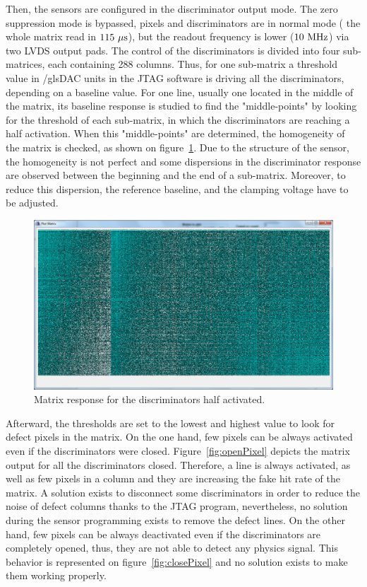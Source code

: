   Then, the sensors are configured in the discriminator output mode.
  The zero suppression mode is bypassed, pixels and discriminators are in normal mode ( the whole matrix read in $115~\mu\rm{s}$), but the readout frequency is lower ($10~\rm{MHz}$) via two \gls{LVDS} output pads.
  The control of the discriminators is divided into four sub-matrices, each containing 288 columns.
  Thus, for one sub-matrix a threshold value in /gls{DAC} units in the \gls{JTAG} software is driving all the discriminators, depending on a baseline value.
  For one line, usually one located in the middle of the matrix, its baseline response is studied to find the "middle-points" by looking for the threshold of each sub-matrix, in which the discriminators are reaching a half activation.
  When this "middle-points" are determined, the homogeneity of the matrix is checked, as shown on figure~\ref{fig:homogeneityMi26}.
  Due to the structure of the sensor, the homogeneity is not perfect and some dispersions in the discriminator response are observed between the beginning and the end of a sub-matrix.
  Moreover, to reduce this dispersion, the reference baseline, and the clamping voltage have to be adjusted.
  
  \begin{figure}[!h]
    \centering
    \includegraphics[width = \textwidth]{Pictures/labTests/discri_middle.png}
    \caption{Matrix response for the discriminators half activated.}
    \label{fig:homogeneityMi26}
  \end{figure}
  
  Afterward, the thresholds are set to the lowest and highest value to look for defect pixels in the matrix.
  On the one hand, few pixels can be always activated even if the discriminators were closed.
  Figure~\ref{fig:openPixel} depicts the matrix output for all the discriminators closed.
  Therefore, a line is always activated, as well as few pixels in a column and they are increasing the fake hit rate of the matrix.
  A solution exists to disconnect some discriminators in order to reduce the noise of defect columns thanks to the \gls{JTAG} program, nevertheless, no solution during the sensor programming exists to remove the defect lines.
  On the other hand, few pixels can be always deactivated even if the discriminators are completely opened, thus, they are not able to detect any physics signal.
  This behavior is represented on figure~\ref{fig:closePixel} and no solution exists to make them working properly.
   
